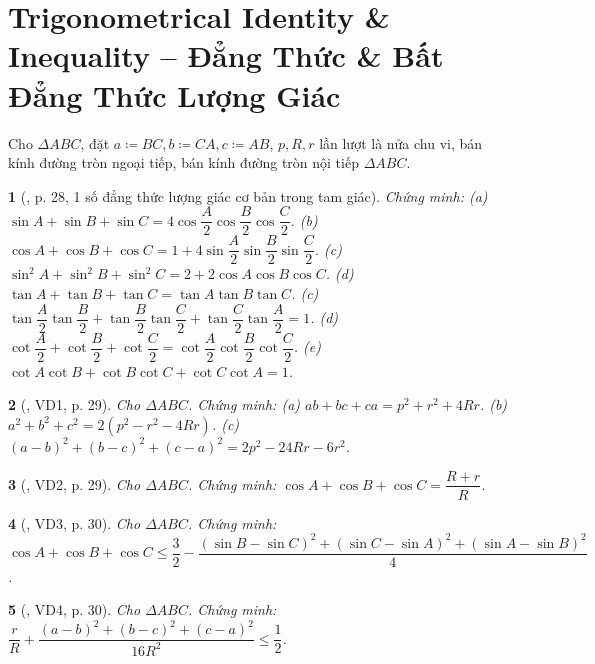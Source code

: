 \documentclass{article}
\newtheorem{baitoan}{}
\begin{document}
\section{Trigonometrical Identity \& Inequality -- Đẳng Thức \& Bất Đẳng Thức Lượng Giác}
Cho $\Delta ABC$, đặt $a\coloneqq BC, b\coloneqq CA, c\coloneqq AB$, $p,R,r$ lần lượt là nửa chu vi, bán kính đường tròn ngoại tiếp, bán kính đường tròn nội tiếp $\Delta ABC$.

\begin{baitoan}[\cite{Hung_nang_cao_phat_trien_Toan_11_tap_1}, p. 28, 1 số đẳng thức lượng giác cơ bản trong tam giác]
	Chứng minh: (a) $\sin A + \sin B + \sin C = 4\cos\dfrac{A}{2}\cos\dfrac{B}{2}\cos\dfrac{C}{2}$. (b) $\cos A + \cos B + \cos C = 1 + 4\sin\dfrac{A}{2}\sin\dfrac{B}{2}\sin\dfrac{C}{2}$. (c) $\sin^2A + \sin^2B + \sin^2C = 2 + 2\cos A\cos B\cos C$. (d) $\tan A + \tan B + \tan C = \tan A\tan B\tan C$. (c) $\tan\dfrac{A}{2}\tan\dfrac{B}{2} + \tan\dfrac{B}{2}\tan\dfrac{C}{2} + \tan\dfrac{C}{2}\tan\dfrac{A}{2} = 1$. (d) $\cot\dfrac{A}{2} + \cot\dfrac{B}{2} + \cot\dfrac{C}{2} = \cot\dfrac{A}{2}\cot\dfrac{B}{2}\cot\dfrac{C}{2}$. (e) $\cot A\cot B + \cot B\cot C + \cot C\cot A = 1$.
\end{baitoan}

\begin{baitoan}[\cite{Hung_nang_cao_phat_trien_Toan_11_tap_1}, VD1, p. 29]
	Cho $\Delta ABC$. Chứng minh: (a) $ab + bc + ca = p^2 + r^2 + 4Rr$. (b) $a^2 + b^2 + c^2 = 2(p^2 - r^2 - 4Rr)$. (c) $(a - b)^2 + (b - c)^2 + (c - a)^2 = 2p^2 - 24Rr - 6r^2$.
\end{baitoan}

\begin{baitoan}[\cite{Hung_nang_cao_phat_trien_Toan_11_tap_1}, VD2, p. 29]
	Cho $\Delta ABC$. Chứng minh: $\cos A + \cos B + \cos C = \dfrac{R + r}{R}$.
\end{baitoan}

\begin{baitoan}[\cite{Hung_nang_cao_phat_trien_Toan_11_tap_1}, VD3, p. 30]
	Cho $\Delta ABC$. Chứng minh: $\cos A + \cos B + \cos C\le\dfrac{3}{2} - \dfrac{(\sin B - \sin C)^2 + (\sin C - \sin A)^2 + (\sin A - \sin B)^2}{4}$.
\end{baitoan}

\begin{baitoan}[\cite{Hung_nang_cao_phat_trien_Toan_11_tap_1}, VD4, p. 30]
	Cho $\Delta ABC$. Chứng minh: $\dfrac{r}{R} + \dfrac{(a - b)^2 + (b - c)^2 + (c - a)^2}{16R^2}\le\dfrac{1}{2}$.
\end{baitoan}
\end{document}
